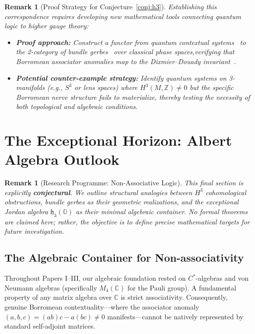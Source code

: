 \documentclass[11pt]{article}
\newtheorem{remark}[theorem]{Remark}
\begin{document}
\begin{remark}[Proof Strategy for Conjecture~\ref{conj:h3}]
Establishing this correspondence requires developing new mathematical tools connecting quantum logic to higher gauge theory:
\begin{itemize}
    \item \textbf{Proof approach:} Construct a functor from quantum contextual systems~\cite{AB11} to the 2-category of bundle gerbes~\cite{Murray96,Brylinski93} over classical phase spaces,\linebreak verifying that Borromean associator anomalies map to the Dixmier--Douady invariant~\cite{DD63}.
    \item \textbf{Potential counter-example strategy:} Identify quantum systems on 3-manifolds (e.g., $S^3$ or lens spaces) where $H^3(M, \mathbb{Z}) \neq 0$ but the specific Borromean nerve structure fails to materialize, thereby testing the necessity of both topological and algebraic conditions.
\end{itemize}
\end{remark}

\section{The Exceptional Horizon: Albert Algebra Outlook}
\label{sec:albert}

\begin{remark}[Research Programme: Non-Associative Logic]
This final section is explicitly \textbf{conjectural}. We outline structural analogies between $H^3$ cohomological obstructions, bundle gerbes as their geometric realizations, and the exceptional Jordan algebra $\mathfrak{h}_3(\mathbb{O})$ as their minimal algebraic container. No formal theorems are claimed here; rather, the objective is to define precise mathematical targets for future investigation.
\end{remark}

\subsection{The Algebraic Container for Non-associativity}

Throughout Papers I--III, our algebraic foundation rested on $C^*$-algebras and von Neumann algebras (specifically $M_4(\mathbb{C})$ for the Pauli group). A fundamental property of any matrix algebra over $\mathbb{C}$ is strict associativity. Consequently, genuine Borromean contextuality---where the associator anomaly $(a,b,c) = (ab)c - a(bc) \neq 0$ manifests---cannot be natively represented by standard self-adjoint matrices.
\end{document}
